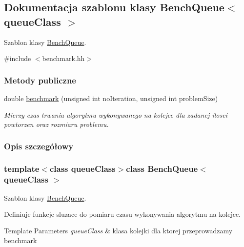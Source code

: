 \hypertarget{class_bench_queue}{\subsection{Dokumentacja szablonu klasy Bench\-Queue$<$ queue\-Class $>$}
\label{class_bench_queue}
}


Szablon klasy \hyperlink{class_bench_queue}{Bench\-Queue}.  




{\ttfamily \#include $<$benchmark.\-hh$>$}

\subsubsection*{Metody publiczne}
\begin{DoxyCompactItemize}
\item 
double \hyperlink{class_bench_queue_a1001661433cd55bac6732ffa0fda4ecc}{benchmark} (unsigned int no\-Iteration, unsigned int problem\-Size)
\begin{DoxyCompactList}\small\item\em Mierzy czas trwania algorytmu wykonywanego na kolejce dla zadanej ilosci powtorzen oraz rozmiaru problemu. \end{DoxyCompactList}\end{DoxyCompactItemize}


\subsubsection{Opis szczegółowy}
\subsubsection*{template$<$class queue\-Class$>$class Bench\-Queue$<$ queue\-Class $>$}

Szablon klasy \hyperlink{class_bench_queue}{Bench\-Queue}. 

Definiuje funkcje sluzace do pomiaru czasu wykonywania algorytmu na kolejce. 
\begin{DoxyTemplParams}{Template Parameters}
{\em queue\-Class} & klasa kolejki dla ktorej przeprowadzamy benchmark \\
\hline
\end{DoxyTemplParams}


